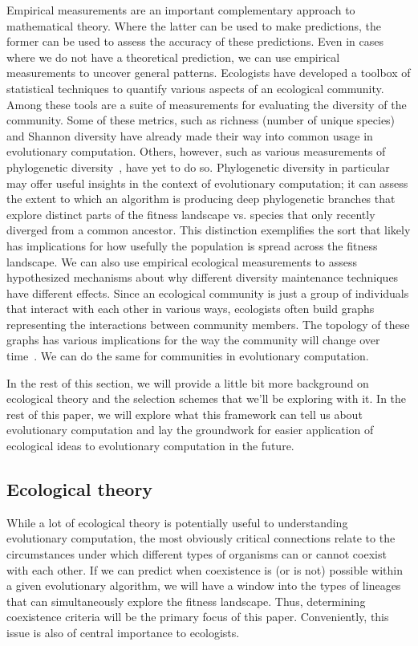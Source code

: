 Empirical measurements are an important complementary approach to mathematical theory. Where the latter can be used to make predictions, the former can be used to assess the accuracy of these predictions. Even in cases where we do not have a theoretical prediction, we can use empirical measurements to uncover general patterns. Ecologists have developed a toolbox of statistical techniques to quantify various aspects of an ecological community. Among these tools are a suite of measurements for evaluating the diversity of the community. Some of these metrics, such as richness (number of unique species) and Shannon diversity have already made their way into common usage in evolutionary computation. Others, however, such as various measurements of phylogenetic diversity~\cite{winter_phylogenetic_2013}, have yet to do so. Phylogenetic diversity in particular may offer useful insights in the context of evolutionary computation; it can assess the extent to which an algorithm is producing deep phylogenetic branches that explore distinct parts of the fitness landscape vs. species that only recently diverged from a common ancestor. This distinction exemplifies the sort that likely has implications for how usefully the population is spread across the fitness landscape. We can also use empirical ecological measurements to assess hypothesized mechanisms about why different diversity maintenance techniques have different effects. Since an ecological community is just a group of individuals that interact with each other in various ways, ecologists often build graphs representing the interactions between community members. The topology of these graphs has various implications for the way the community will change over time~\cite{fontaine_ecological_2011}. We can do the same for communities in evolutionary computation.

In the rest of this section, we will provide a little bit more background on ecological theory and the selection schemes that we'll be exploring with it. In the rest of this paper, we will explore what this framework can tell us about evolutionary computation and lay the groundwork for easier application of ecological ideas to evolutionary computation in the future.

\subsection{Ecological theory}

While a lot of ecological theory is potentially useful to understanding evolutionary computation, the most obviously critical connections relate to the circumstances under which different types of organisms can or cannot coexist with each other. If we can predict when coexistence is (or is not) possible within a given evolutionary algorithm, we will have a window into the types of lineages that can simultaneously explore the fitness landscape. Thus, determining coexistence criteria will be the primary focus of this paper. Conveniently, this issue is also of central importance to ecologists.

